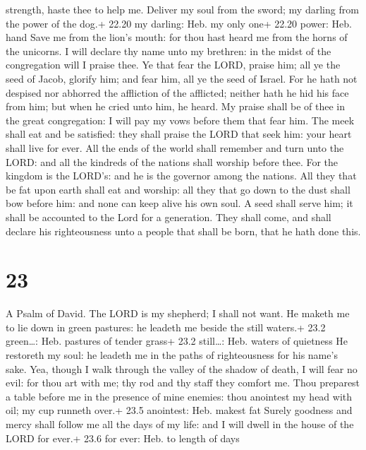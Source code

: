 strength, haste thee to help me.  Deliver my soul from the
sword; my darling from the power of the dog.+ 22.20 my darling: Heb. my
only one+ 22.20 power: Heb. hand  Save me from the lion's
mouth: for thou hast heard me from the horns of the unicorns.
 I will declare thy name unto my brethren: in the midst of
the congregation will I praise thee.  Ye that fear the
LORD, praise him; all ye the seed of Jacob, glorify him; and fear him,
all ye the seed of Israel.  For he hath not despised nor
abhorred the affliction of the afflicted; neither hath he hid his face
from him; but when he cried unto him, he heard.  My praise
shall be of thee in the great congregation: I will pay my vows before
them that fear him.  The meek shall eat and be satisfied:
they shall praise the LORD that seek him: your heart shall live for
ever.  All the ends of the world shall remember and turn
unto the LORD: and all the kindreds of the nations shall worship before
thee.  For the kingdom is the LORD's: and he is the
governor among the nations.  All they that be fat upon
earth shall eat and worship: all they that go down to the dust shall bow
before him: and none can keep alive his own soul.  A seed
shall serve him; it shall be accounted to the Lord for a generation.
 They shall come, and shall declare his righteousness unto
a people that shall be born, that he hath done this.

\hypertarget{section-22}{%
\section{23}\label{section-22}}

A Psalm of David.  The LORD is my shepherd; I shall not
want.  He maketh me to lie down in green pastures: he
leadeth me beside the still waters.+ 23.2 green\ldots: Heb. pastures of
tender grass+ 23.2 still\ldots: Heb. waters of quietness  He
restoreth my soul: he leadeth me in the paths of righteousness for his
name's sake.  Yea, though I walk through the valley of the
shadow of death, I will fear no evil: for thou art with me; thy rod and
thy staff they comfort me.  Thou preparest a table before me
in the presence of mine enemies: thou anointest my head with oil; my cup
runneth over.+ 23.5 anointest: Heb. makest fat  Surely
goodness and mercy shall follow me all the days of my life: and I will
dwell in the house of the LORD for ever.+ 23.6 for ever: Heb. to length
of days

